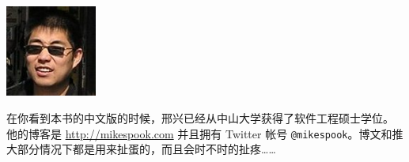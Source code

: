 \includegraphics[width=3cm]{fig/avatar-xingx-128x128}

在你看到本书的中文版的时候，邢兴已经从中山大学获得了软件工程硕士学位。
他的博客是 \url{http://mikespook.com} 并且拥有 Twitter 帐号
\texttt{@mikespook}。博文和推大部分情况下都是用来扯蛋的，而且会时不时的扯疼……
